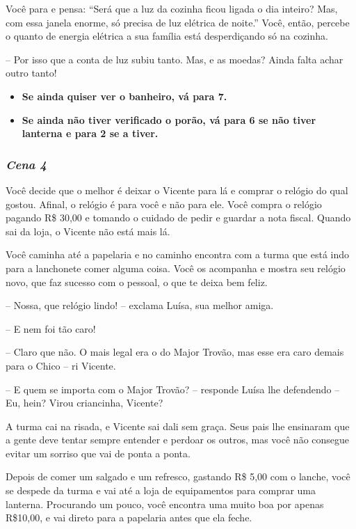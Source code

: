Você para e pensa: “Será que a luz da cozinha ficou ligada o dia inteiro? Mas, com essa janela enorme, só precisa de luz elétrica de noite.” Você, então, percebe o quanto de energia elétrica a sua família está desperdiçando só na cozinha.

-- Por isso que a conta de luz subiu tanto. Mas, e as moedas? Ainda falta achar outro tanto!

\begin{itemize}
	\item \textbf{Se ainda quiser ver o banheiro, vá para 7.}
	\item \textbf{Se ainda não tiver verificado o porão, vá para 6 se não tiver lanterna e para 2 se a tiver.}
\end{itemize}

\bigskip\medskip

\subsubsection*{\textit{\textbf{Cena 4}}}
Você decide que o melhor é deixar o Vicente para lá e comprar o relógio do qual gostou. Afinal, o relógio é para você e não para ele. Você compra o relógio pagando R\$ 30,00 e tomando o cuidado de pedir e guardar a nota fiscal. Quando sai da loja, o Vicente não está mais lá.

Você caminha até a papelaria e no caminho encontra com a turma que está indo para a lanchonete comer alguma coisa. Você os acompanha e mostra seu relógio novo, que faz sucesso com o pessoal, o que te deixa bem feliz.

-- Nossa, que relógio lindo! -- exclama Luísa, sua melhor amiga.

-- E nem foi tão caro!

-- Claro que não. O mais legal era o do Major Trovão, mas esse era caro demais para o Chico -- ri Vicente.

-- E quem se importa com o Major Trovão? -- responde Luísa lhe defendendo --
Eu, hein? Virou criancinha, Vicente?

A turma cai na risada, e Vicente sai dali sem graça. Seus pais lhe ensinaram que a gente deve tentar sempre entender e perdoar os outros, mas você não consegue evitar um sorriso que vai de ponta a ponta.

Depois de comer um salgado e um refresco, gastando R\$ 5,00 com o lanche, você se despede da turma e vai até a loja de equipamentos para comprar uma lanterna. Procurando um pouco, você encontra uma muito boa por apenas R\$10,00, e vai direto para a papelaria antes que ela feche.

